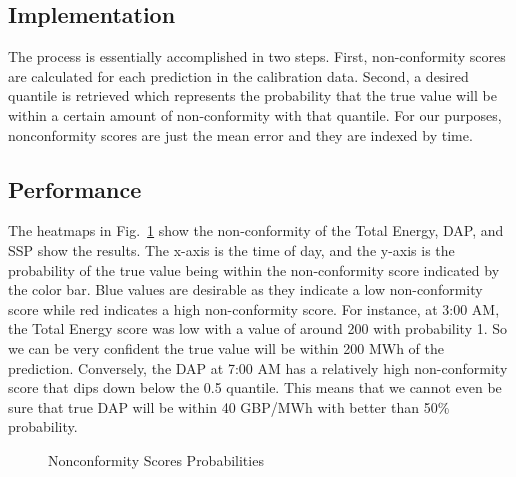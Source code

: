\documentclass[
  journal,
]{IEEEtran}%
\begin{document}
\subsection{Implementation}\label{implementation}

The process is essentially accomplished in two steps. First,
non-conformity scores are calculated for each prediction in the
calibration data. Second, a desired quantile is retrieved which
represents the probability that the true value will be within a certain
amount of non-conformity with that quantile. For our purposes,
nonconformity scores are just the mean error and they are indexed by
time.

\subsection{Performance}\label{performance-1}

The heatmaps in Fig.~\ref{fig-nonconformity-heatmaps} show the
non-conformity of the Total Energy, DAP, and SSP show the results. The
x-axis is the time of day, and the y-axis is the probability of the true
value being within the non-conformity score indicated by the color bar.
Blue values are desirable as they indicate a low non-conformity score
while red indicates a high non-conformity score. For instance, at 3:00
AM, the Total Energy score was low with a value of around 200 with
probability 1. So we can be very confident the true value will be within
200 MWh of the prediction. Conversely, the DAP at 7:00 AM has a
relatively high non-conformity score that dips down below the 0.5
quantile. This means that we cannot even be sure that true DAP will be
within 40 GBP/MWh with better than 50\% probability.

\begin{figure}


\caption{\label{fig-nonconformity-heatmaps}Nonconformity Scores
Probabilities}

\end{figure}%
\end{document}
